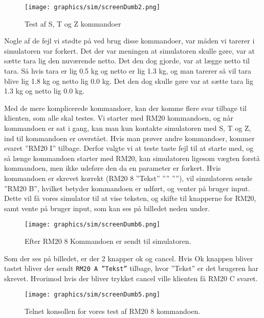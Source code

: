 \documentclass[a4paper]{article}
\newenvironment{changemargin}[2]{%
\begin{list}{}{%
\setlength{\topsep}{0pt}%
\setlength{\leftmargin}{#1}%
\setlength{\rightmargin}{#2}%
\setlength{\listparindent}{\parindent}%
\setlength{\itemindent}{\parindent}%
\setlength{\parsep}{\parskip}%
}%
\item[]}{\end{list}}
\begin{document}
\begin{figure}[h!]
\begin{changemargin}{-1cm}{}
  \centering
  \texttt{[image: graphics/sim/screenDumb2.png]}
  \caption{Test af S, T og Z kommandoer}
\end{changemargin}
\end{figure}

Nogle af de fejl vi stødte på ved brug disse kommandoer, var måden vi tarerer i simulatoren var forkert. Det der var meningen at simulatoren skulle gøre, var at sætte tara lig den nuværende netto. Det den dog gjorde, var at lægge netto til tara. Så hvis tara er lig 0.5 kg og netto er lig 1.3 kg, og man tarerer så vil tara blive lig 1.8 kg og netto lig 0.0 kg. Det den dog skulle gøre var at sætte tara lig 1.3 kg og netto lig 0.0 kg.

Med de mere komplicerede kommandoer, kan der komme flere svar tilbage til klienten, som alle skal testes. Vi starter med RM20 kommandoen, og når kommandoen er sat i gang, kan man kun kontakte simulatoren med S, T og Z, ind til kommandoen er overstået. Hvis man prøver andre kommandoer, kommer svaret ”RM20 I” tilbage. Derfor valgte vi at teste taste fejl til at starte med, og så længe kommandoen starter med RM20, kan simulatoren ligesom vægten forstå kommandoen, men ikke udeføre den da en parameter er forkert. Hvis kommandoen er skrevet korrekt (RM20 8 ”Tekst” ”” ””), vil simulatoren sende ”RM20 B”, hvilket betyder kommandoen er udført, og venter på bruger input. Dette vil få vores simulator til at vise teksten, og skifte til knapperne for RM20, samt vente på bruger input, som kan ses på billedet neden under.

\begin{figure}[H]
\begin{changemargin}{-1.3cm}{}
  \centering
  \texttt{[image: graphics/sim/screenDumb6.png]}
  \caption{Efter RM20 8 Kommandoen er sendt til simulatoren.}
\end{changemargin}
\end{figure}

Som der ses på billedet, er der 2 knapper ok og cancel. Hvis Ok knappen bliver tastet bliver der sendt \texttt{RM20 A ”Tekst”} tilbage, hvor ”Tekst” er det brugeren har skrevet. Hvorimod hvis der bliver trykket cancel ville klienten få RM20 C svaret.

\begin{figure}[H]
\begin{changemargin}{-1cm}{}
  \centering
  \texttt{[image: graphics/sim/screenDumb5.png]}
  \caption{Telnet konsollen for vores test af RM20 8 kommandoen.}
\end{changemargin}
\end{figure}
\end{document}
